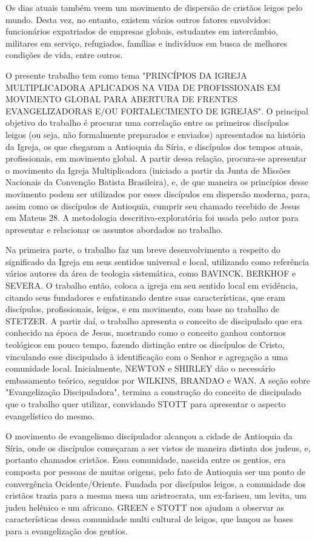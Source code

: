 \documentclass[12pt,openright,oneside,a4paper]{abntex2}
\begin{document}
Os dias atuais também veem um movimento de dispersão de cristãos leigos pelo mundo. Desta vez, no entanto, existem vários outros fatores envolvidos:  funcionários expatriados de empresas globais, estudantes em intercâmbio, militares em serviço, refugiados, famílias e indivíduos em busca de melhores condições de vida, entre outros. 

O presente trabalho tem como tema "PRINCÍPIOS DA IGREJA MULTIPLICADORA APLICADOS NA VIDA DE PROFISSIONAIS EM MOVIMENTO GLOBAL PARA ABERTURA DE FRENTES EVANGELIZADORAS E/OU FORTALECIMENTO DE IGREJAS". O principal objetivo do trabalho é procurar uma correlação entre os primeiros discípulos leigos (ou seja, não formalmente preparados e enviados) apresentados na história da Igreja, os que chegaram a Antioquia da Síria, e discípulos dos tempos atuais, profissionais, em movimento global. A partir dessa relação, procura-se apresentar o movimento da Igreja Multiplicadora (iniciado a partir da Junta de Missões Nacionais da Convenção Batista Brasileira), e, de que maneira os princípios desse movimento podem ser utilizados por esses discípulos em dispersão moderna, para, assim como os discípulos de Antioquia, cumprir seu chamado recebido de Jesus em Mateus 28. A metodologia descritiva-exploratória foi usada pelo autor para apresentar e relacionar os assuntos abordados no trabalho.

Na primeira parte, o trabalho faz um breve desenvolvimento a respeito do significado da Igreja em seus sentidos universal e local, utilizando como referência vários autores da área de teologia sistemática, como BAVINCK, BERKHOF e SEVERA. O trabalho então, coloca a igreja em seu sentido local em evidência, citando seus fundadores e enfatizando dentre suas características, que eram discípulos, profissionais, leigos, e em movimento, com base no trabalho de STETZER. A partir daí, o trabalho apresenta o conceito de discipulado que era conhecido na época de Jesus, mostrando como o conceito ganhou contornos teológicos em pouco tempo, fazendo distinção entre os discípulos de Cristo, vinculando esse discipulado à identificação com o Senhor e agregação a uma comunidade local. Inicialmente, NEWTON e SHIRLEY dão o necessário embasamento teórico, seguidos por WILKINS, BRANDAO e WAN. A seção sobre "Evangelização Discipuladora", termina a construção do conceito de discipulado que o trabalho quer utilizar, convidando STOTT para apresentar o aspecto evangelístico do mesmo.

O movimento de evangelismo discipulador alcançou a cidade de Antioquia da Síria, onde os discípulos começaram a ser vistos de maneira distinta dos judeus, e, portanto chamados cristãos. Essa comunidade, nascida entre os gentios, era composta por pessoas de muitas origens, pelo fato de Antioquia ser um ponto de convergência Ocidente/Oriente. Fundada por discípulos leigos, a comunidade dos cristãos trazia para a mesma mesa um aristrocrata, um ex-fariseu, um levita, um judeu helênico e um africano. GREEN e STOTT nos ajudam a observar as características dessa comunidade multi cultural de leigos, que lançou as bases para a evangelização dos gentios. 
\end{document}
